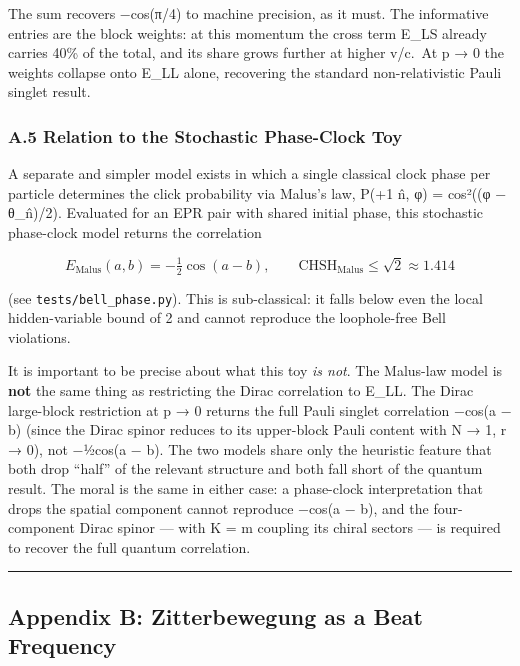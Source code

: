 \documentclass[
]{article}
\begin{document}
The sum recovers −cos(π/4) to machine precision, as it must. The
informative entries are the block weights: at this momentum the cross
term E\_LS already carries 40\% of the total, and its share grows
further at higher v/c.~At p → 0 the weights collapse onto E\_LL alone,
recovering the standard non-relativistic Pauli singlet result.

\subsubsection{A.5 Relation to the Stochastic Phase-Clock
Toy}\label{a.5-relation-to-the-stochastic-phase-clock-toy}

A separate and simpler model exists in which a single classical clock
phase per particle determines the click probability via Malus's law,
P(+1 \textbar{} n̂, φ) = cos²((φ − θ\_n̂)/2). Evaluated for an EPR pair
with shared initial phase, this stochastic phase-clock model returns the
correlation

\[E_{\text{Malus}}(a, b) = -\tfrac{1}{2}\cos(a - b), \qquad \text{CHSH}_{\text{Malus}} \leq \sqrt{2} \approx 1.414\]

(see \texttt{tests/bell\_phase.py}). This is sub-classical: it falls
below even the local hidden-variable bound of 2 and cannot reproduce the
loophole-free Bell violations.

It is important to be precise about what this toy \emph{is not}. The
Malus-law model is \textbf{not} the same thing as restricting the Dirac
correlation to E\_LL. The Dirac large-block restriction at p → 0 returns
the full Pauli singlet correlation −cos(a − b) (since the Dirac spinor
reduces to its upper-block Pauli content with N → 1, r → 0), not −½cos(a
− b). The two models share only the heuristic feature that both drop
``half'' of the relevant structure and both fall short of the quantum
result. The moral is the same in either case: a phase-clock
interpretation that drops the spatial component cannot reproduce −cos(a
− b), and the four-component Dirac spinor --- with K = m coupling its
chiral sectors --- is required to recover the full quantum correlation.

\begin{center}\rule{0.5\linewidth}{0.5pt}\end{center}

\subsection{Appendix B: Zitterbewegung as a Beat
Frequency}\label{appendix-b-zitterbewegung-as-a-beat-frequency}
\end{document}
